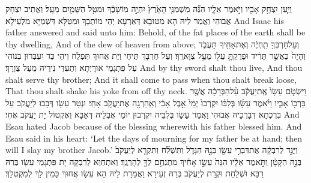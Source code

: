 {וַיַּ֛עַן יִצְחָ֥ק אָבִ֖יו וַיֹּ֣אמֶר אֵלָ֑יו הִנֵּ֞ה מִשְׁמַנֵּ֤י הָאָ֙רֶץ֙ יִהְיֶ֣ה מֽוֹשָׁבֶ֔ךָ וּמִטַּ֥ל הַשָּׁמַ֖יִם מֵעָֽל׃}
{וַאֲתֵיב יִצְחָק אֲבוּהִי וַאֲמַר לֵיהּ הָא מִטּוּבָא דְּאַרְעָא יְהֵי מוֹתְבָךְ וּמִטַּלָּא דִּשְׁמַיָּא מִלְּעֵילָא׃}
{And Isaac his father answered and said unto him: Behold, of the fat places of the earth shall be thy dwelling, And of the dew of heaven from above;}{}
{וְעַל\maqqaf חַרְבְּךָ֣ תִֽחְיֶ֔ה וְאֶת\maqqaf אָחִ֖יךָ תַּעֲבֹ֑ד וְהָיָה֙ כַּאֲשֶׁ֣ר תָּרִ֔יד וּפָרַקְתָּ֥ עֻלּ֖וֹ מֵעַ֥ל צַוָּארֶֽךָ׃}
{וְעַל חַרְבָּךְ תֵּיחֵי וְיָת אֲחוּךְ תִּפְלַח וִיהֵי כַּד יִעְבְּרוּן בְּנוֹהִי עַל פִּתְגָמֵי אוֹרָיְתָא וְתַעְדֵּי נִירֵיהּ מֵעַל צַוְרָךְ׃}
{And by thy sword shalt thou live, And thou shalt serve thy brother; And it shall come to pass when thou shalt break loose, That thou shalt shake his yoke from off thy neck.}{}
{וַיִּשְׂטֹ֤ם עֵשָׂו֙ אֶֽת\maqqaf יַעֲקֹ֔ב עַ֨ל\maqqaf הַבְּרָכָ֔ה אֲשֶׁ֥ר בֵּרְכ֖וֹ אָבִ֑יו וַיֹּ֨אמֶר עֵשָׂ֜ו בְּלִבּ֗וֹ יִקְרְבוּ֙ יְמֵי֙ אֵ֣בֶל אָבִ֔י וְאַֽהַרְגָ֖ה אֶת\maqqaf יַעֲקֹ֥ב אָחִֽי׃}
{וּנְטַר עֵשָׂו דְּבָבוּ לְיַעֲקֹב עַל בִּרְכְתָא דְּבָרְכֵיהּ אֲבוּהִי וַאֲמַר עֵשָׂו בְּלִבֵּיהּ יִקְרְבוּן יוֹמֵי אֶבְלֵיהּ דְּאַבָּא וְאֶקְטוֹל יָת יַעֲקֹב אֲחִי׃}
{And Esau hated Jacob because of the blessing wherewith his father blessed him. And Esau said in his heart: ‘Let the days of mourning for my father be at hand; then will I slay my brother Jacob.’}{}
{וַיֻּגַּ֣ד לְרִבְקָ֔ה אֶת\maqqaf דִּבְרֵ֥י עֵשָׂ֖ו בְּנָ֣הּ הַגָּדֹ֑ל וַתִּשְׁלַ֞ח וַתִּקְרָ֤א לְיַעֲקֹב֙ בְּנָ֣הּ הַקָּטָ֔ן וַתֹּ֣אמֶר אֵלָ֔יו הִנֵּה֙ עֵשָׂ֣ו אָחִ֔יךָ מִתְנַחֵ֥ם לְךָ֖ לְהׇרְגֶֽךָ׃}
{וְאִתְחַוַּא לְרִבְקָה יָת פִּתְגָמֵי עֵשָׂו בְּרַהּ רַבָּא וּשְׁלַחַת וּקְרָת לְיַעֲקֹב בְּרַהּ זְעֵירָא וַאֲמַרַת לֵיהּ הָא עֵשָׂו אֲחוּךְ כָּמֵין לָךְ לְמִקְטְלָךְ׃}
